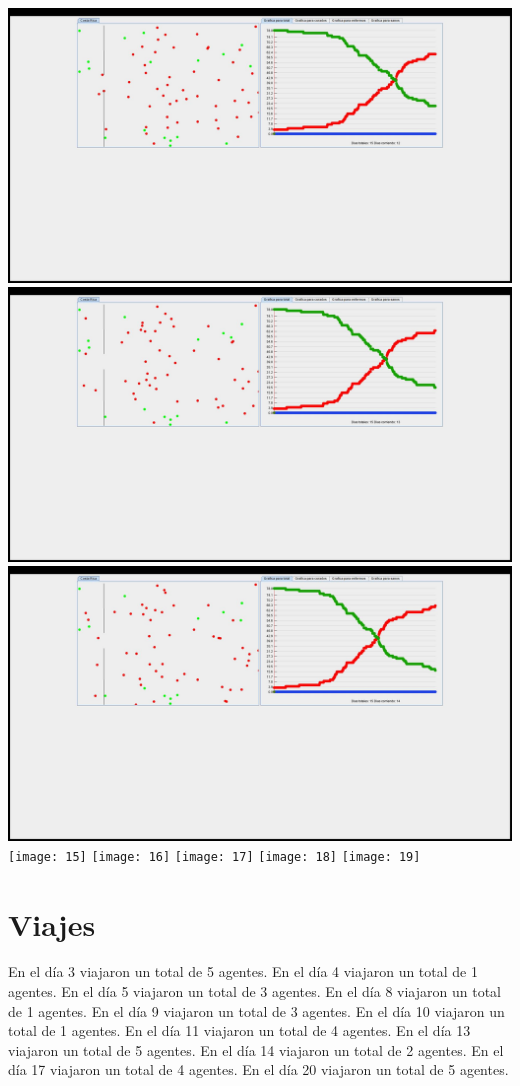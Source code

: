 \documentclass{report}
\begin{document}
\includegraphics[scale=0.20]{12}
\includegraphics[scale=0.20]{13}
\includegraphics[scale=0.20]{14}
\texttt{[image: 15]}
\texttt{[image: 16]}
\texttt{[image: 17]}
\texttt{[image: 18]}
\texttt{[image: 19]}
\newpage
\section{Viajes}
En el d\'ia 3 viajaron un total de 5 agentes.\n
En el d\'ia 4 viajaron un total de 1 agentes.\n
En el d\'ia 5 viajaron un total de 3 agentes.\n
En el d\'ia 8 viajaron un total de 1 agentes.\n
En el d\'ia 9 viajaron un total de 3 agentes.\n
En el d\'ia 10 viajaron un total de 1 agentes.\n
En el d\'ia 11 viajaron un total de 4 agentes.\n
En el d\'ia 13 viajaron un total de 5 agentes.\n
En el d\'ia 14 viajaron un total de 2 agentes.\n
En el d\'ia 17 viajaron un total de 4 agentes.\n
En el d\'ia 20 viajaron un total de 5 agentes.\newline
\end{document}
